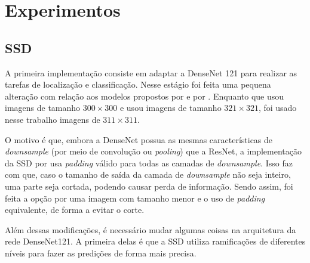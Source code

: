 \chapter{Experimentos}
\label{cap:5}
\vspace{-1.9cm}

\section{SSD}
\label{secao:5:1}

A primeira implementação consiste em adaptar a \ac{DenseNet} 121 para realizar as tarefas de localização e classificação. Nesse estágio foi feita uma pequena alteração com relação aos modelos propostos por  e por . Enquanto que  usou imagens de tamanho $300 \times 300$ e  usou imagens de tamanho $321\times 321$, foi usado nesse trabalho imagens de $311 \times 311$.

O motivo é que, embora a \ac{DenseNet} possua as mesmas características de \textit{downsample} (por meio de convolução ou \textit{pooling}) que a \ac{ResNet}, a implementação da \ac{SSD} por  usa \textit{padding} válido para todas as camadas de \textit{downsample}. Isso faz com que, caso o tamanho de saída da camada de \textit{downsample} não seja inteiro, uma parte seja cortada, podendo causar perda de informação. Sendo assim, foi feita a opção por uma imagem com tamanho menor e o uso de \textit{padding} equivalente, de forma a evitar o corte.

Além dessas modificações, é necessário mudar algumas coisas na arquitetura da rede \ac{DenseNet}121. A primeira delas é que a SSD utiliza ramificações de diferentes níveis para fazer as predições de forma mais precisa.